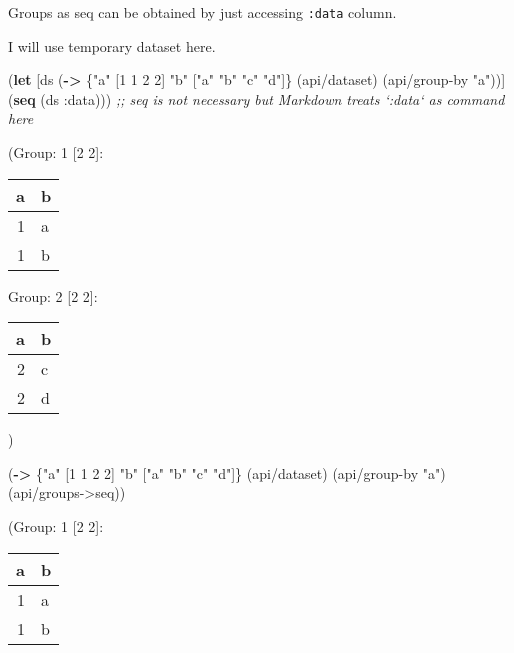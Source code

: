 \documentclass[]{article}
\newenvironment{Shaded}{\begin{snugshade}}{\end{snugshade}}
\newcommand{\KeywordTok}[1]{\textcolor[rgb]{0.13,0.29,0.53}{\textbf{#1}}}
\newcommand{\DecValTok}[1]{\textcolor[rgb]{0.00,0.00,0.81}{#1}}
\newcommand{\StringTok}[1]{\textcolor[rgb]{0.31,0.60,0.02}{#1}}
\newcommand{\CommentTok}[1]{\textcolor[rgb]{0.56,0.35,0.01}{\textit{#1}}}
\newcommand{\AttributeTok}[1]{\textcolor[rgb]{0.77,0.63,0.00}{#1}}
\newcommand{\NormalTok}[1]{#1}
\begin{document}
Groups as seq can be obtained by just accessing \texttt{:data} column.

I will use temporary dataset here.

\begin{Shaded}
\begin{Highlighting}[]
\NormalTok{(}\KeywordTok{let}\NormalTok{ [ds (}\KeywordTok{->}\NormalTok{ \{}\StringTok{"a"}\NormalTok{ [}\DecValTok{1} \DecValTok{1} \DecValTok{2} \DecValTok{2}\NormalTok{]}
              \StringTok{"b"}\NormalTok{ [}\StringTok{"a"} \StringTok{"b"} \StringTok{"c"} \StringTok{"d"}\NormalTok{]\}}
\NormalTok{             (api/dataset)}
\NormalTok{             (api/group-by }\StringTok{"a"}\NormalTok{))]}
\NormalTok{  (}\KeywordTok{seq}\NormalTok{ (ds }\AttributeTok{:data}\NormalTok{))) }\CommentTok{;; seq is not necessary but Markdown treats `:data` as command here}
\end{Highlighting}
\end{Shaded}

(Group: 1 {[}2 2{]}:

\begin{longtable}[]{@{}rl@{}}
\toprule
a & b\tabularnewline
\midrule
\endhead
1 & a\tabularnewline
1 & b\tabularnewline
\bottomrule
\end{longtable}

Group: 2 {[}2 2{]}:

\begin{longtable}[]{@{}rl@{}}
\toprule
a & b\tabularnewline
\midrule
\endhead
2 & c\tabularnewline
2 & d\tabularnewline
\bottomrule
\end{longtable}

)

\begin{Shaded}
\begin{Highlighting}[]
\NormalTok{(}\KeywordTok{->}\NormalTok{ \{}\StringTok{"a"}\NormalTok{ [}\DecValTok{1} \DecValTok{1} \DecValTok{2} \DecValTok{2}\NormalTok{]}
     \StringTok{"b"}\NormalTok{ [}\StringTok{"a"} \StringTok{"b"} \StringTok{"c"} \StringTok{"d"}\NormalTok{]\}}
\NormalTok{    (api/dataset)}
\NormalTok{    (api/group-by }\StringTok{"a"}\NormalTok{)}
\NormalTok{    (api/groups->seq))}
\end{Highlighting}
\end{Shaded}

(Group: 1 {[}2 2{]}:

\begin{longtable}[]{@{}rl@{}}
\toprule
a & b\tabularnewline
\midrule
\endhead
1 & a\tabularnewline
1 & b\tabularnewline
\bottomrule
\end{longtable}
\end{document}
